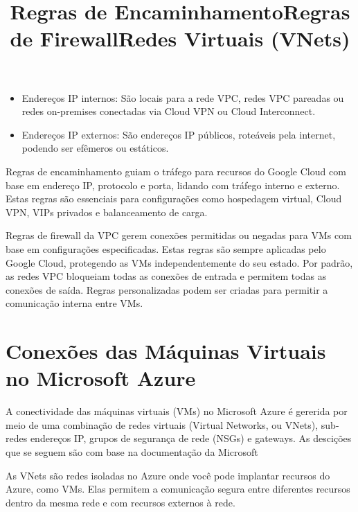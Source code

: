 \begin{itemize}
\item Endereços IP internos: São locais para a rede VPC, redes VPC pareadas ou 
redes on-premises conectadas via Cloud VPN ou Cloud Interconnect.
\item Endereços IP externos: São endereços IP públicos, roteáveis pela internet, 
podendo ser efêmeros ou estáticos.
\end{itemize}



\title*{\textbf{Regras de Encaminhamento}}

Regras de encaminhamento guiam o tráfego para recursos do Google Cloud com base 
em endereço IP, protocolo e porta, lidando com tráfego interno e externo. Estas regras são 
essenciais para configurações como hospedagem virtual, Cloud VPN, VIPs privados e 
balanceamento de carga. \\




\title*{\textbf{Regras de Firewall}}

Regras de firewall da VPC gerem conexões permitidas ou negadas para VMs com 
base em configurações especificadas. Estas regras são sempre aplicadas pelo Google 
Cloud, protegendo as VMs independentemente do seu estado. Por padrão, as redes VPC 
bloqueiam todas as conexões de entrada e permitem todas as conexões de saída. Regras 
personalizadas podem ser criadas para permitir a comunicação interna entre VMs. \\








\section{Conexões das Máquinas Virtuais no Microsoft Azure}

A conectividade das máquinas virtuais (VMs) no Microsoft Azure é gererida por meio 
de uma combinação de redes virtuais (Virtual Networks, ou VNets), sub-redes endereços IP, 
grupos de segurança de rede (NSGs) e gateways.
As descições que se seguem são com base na documentação da Microsoft \cite{azurecloud} \\

\title*{\textbf{Redes Virtuais (VNets)}}

As VNets são redes isoladas no Azure onde você pode implantar recursos do Azure, 
como VMs. Elas permitem a comunicação segura entre diferentes recursos dentro da 
mesma rede e com recursos externos à rede.\\

